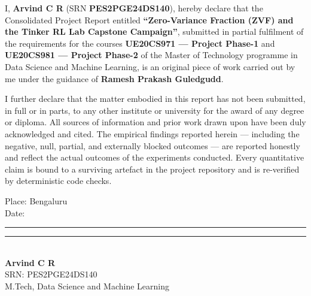 \documentclass[12pt,a4paper]{report}
\begin{document}
I, \textbf{Arvind C R} (SRN \textbf{PES2PGE24DS140}), hereby declare that the
Consolidated Project Report entitled \textbf{``Zero-Variance Fraction (ZVF) and
the Tinker RL Lab Capstone Campaign''}, submitted in partial fulfilment of the
requirements for the courses \textbf{UE20CS971 --- Project Phase-1} and
\textbf{UE20CS981 --- Project Phase-2} of the Master of Technology programme in
Data Science and Machine Learning, is an original piece of work carried out by me
under the guidance of \textbf{Ramesh Prakash Guledgudd}.

\vspace{0.6em}

I further declare that the matter embodied in this report has not been submitted,
in full or in parts, to any other institute or university for the award of any
degree or diploma. All sources of information and prior work drawn upon have been
duly acknowledged and cited. The empirical findings reported herein --- including
the negative, null, partial, and externally blocked outcomes --- are reported
honestly and reflect the actual outcomes of the experiments conducted. Every
quantitative claim is bound to a surviving artefact in the project repository and
is re-verified by deterministic code checks.

\vspace{3.2em}

\noindent
\begin{minipage}[t]{0.5\linewidth}
Place: Bengaluru\\[0.4em]
Date: \rule{3cm}{0.4pt}
\end{minipage}
\hfill
\begin{minipage}[t]{0.45\linewidth}
\centering
\vspace{1.2em}
\rule{5cm}{0.4pt}\\
\textbf{Arvind C R}\\
SRN: PES2PGE24DS140\\
M.Tech, Data Science and Machine Learning
\end{minipage}

\clearpage
\hypersetup{pageanchor=true}
\setcounter{page}{1}
\end{document}
